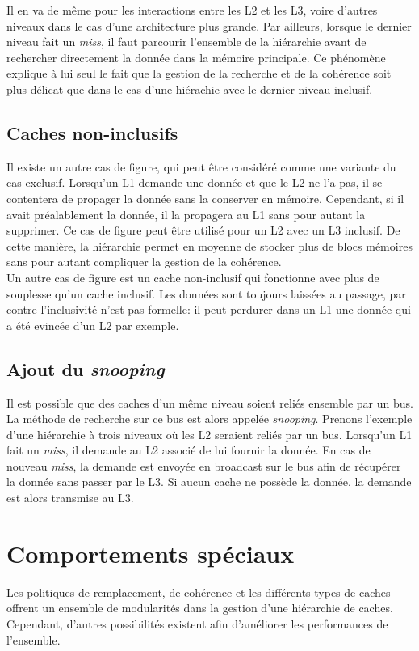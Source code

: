 Il en va de même pour les interactions entre les L2 et les L3, voire d'autres niveaux dans le cas d'une architecture plus grande. Par ailleurs, lorsque le dernier niveau fait un \textit{miss}, il faut parcourir l'ensemble de la hiérarchie avant de rechercher directement la donnée dans la mémoire principale. Ce phénomène explique à lui seul le fait que la gestion de la recherche et de la cohérence soit plus délicat que dans le cas d'une hiérachie avec le dernier niveau inclusif.

\subsection{Caches non-inclusifs}
Il existe un autre cas de figure, qui peut être considéré comme une variante du cas exclusif. Lorsqu'un L1 demande une donnée et que le L2 ne l'a pas, il se contentera de propager la donnée sans la conserver en mémoire. Cependant, si il avait préalablement la donnée, il la propagera au L1 sans pour autant la supprimer. Ce cas de figure peut être utilisé pour un L2 avec un L3 inclusif. De cette manière, la hiérarchie permet en moyenne de stocker plus de blocs mémoires sans pour autant compliquer la gestion de la cohérence. \\

Un autre cas de figure est un cache non-inclusif qui fonctionne avec plus de souplesse qu'un cache inclusif. Les données sont toujours laissées au passage, par contre l'inclusivité n'est pas formelle: il peut perdurer dans un L1 une donnée qui a été evincée d'un L2 par exemple.

\subsection{Ajout du \emph{snooping}}
\label{snooping}
 Il est possible que des caches d'un même niveau soient reliés ensemble par un bus. La méthode de recherche sur ce bus est alors appelée \emph{snooping}. Prenons l'exemple d'une hiérarchie à trois niveaux où les L2 seraient reliés par un bus. Lorsqu'un L1 fait un \textit{miss}, il demande au L2 associé de lui fournir la donnée. En cas de nouveau \textit{miss}, la demande est envoyée en broadcast sur le bus afin de récupérer la donnée sans passer par le L3. Si aucun cache ne possède la donnée, la demande est alors transmise au L3.

\newpage
\section{Comportements spéciaux}
Les politiques de remplacement, de cohérence et les différents types de caches offrent un ensemble de modularités dans la gestion d'une hiérarchie de caches. Cependant, d'autres possibilités existent afin d'améliorer les performances de l'ensemble.

